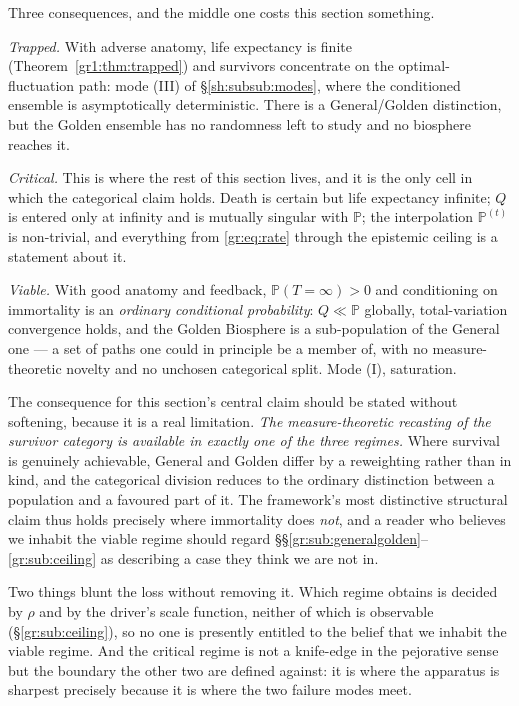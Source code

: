\documentclass[11pt]{article}
\numberwithin{equation}{section}
\theoremstyle{plain}
\theoremstyle{definition}
\theoremstyle{remark}
\newcommand{\PP}{\mathbb{P}}
\begin{document}
Three consequences, and the middle one costs this section something.

\emph{Trapped.} With adverse anatomy, life expectancy is finite
(Theorem~\ref{gr1:thm:trapped}) and survivors concentrate on the
optimal-fluctuation path: mode (III) of \S\ref{sh:subsub:modes}, where
the conditioned ensemble is asymptotically deterministic. There is a
General/Golden distinction, but the Golden ensemble has no randomness
left to study and no biosphere reaches it.

\emph{Critical.} This is where the rest of this section lives, and it is
the only cell in which the categorical claim holds. Death is certain but
life expectancy infinite; $Q$ is entered only at infinity and is
mutually singular with $\PP$; the interpolation $\PP^{(t)}$ is
non-trivial, and everything from \eqref{gr:eq:rate} through the
epistemic ceiling is a statement about it.

\emph{Viable.} With good anatomy and feedback, $\PP(T=\infty)>0$ and
conditioning on immortality is an \emph{ordinary conditional
probability}: $Q\ll\PP$ globally, total-variation convergence holds, and
the Golden Biosphere is a sub-population of the General one --- a set of
paths one could in principle be a member of, with no measure-theoretic
novelty and no unchosen categorical split. Mode (I), saturation.

The consequence for this section's central claim should be stated
without softening, because it is a real limitation. \emph{The
measure-theoretic recasting of the survivor category is available in
exactly one of the three regimes.} Where survival is genuinely
achievable, General and Golden differ by a reweighting rather than in
kind, and the categorical division reduces to the ordinary distinction
between a population and a favoured part of it. The framework's most
distinctive structural claim thus holds precisely where immortality does
\emph{not}, and a reader who believes we inhabit the viable regime
should regard \S\S\ref{gr:sub:generalgolden}--\ref{gr:sub:ceiling} as
describing a case they think we are not in.

Two things blunt the loss without removing it. Which regime obtains is
decided by $\rho$ and by the driver's scale function, neither of which
is observable (\S\ref{gr:sub:ceiling}), so no one is presently entitled
to the belief that we inhabit the viable regime. And the critical regime
is not a knife-edge in the pejorative sense but the boundary the other
two are defined against: it is where the apparatus is sharpest precisely
because it is where the two failure modes meet.
\end{document}
